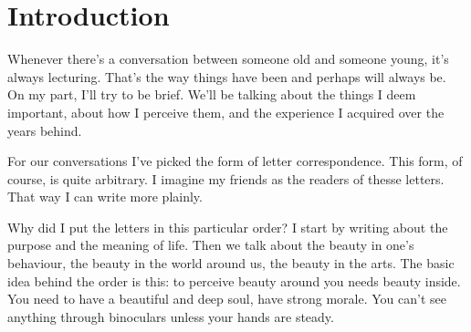 \chapter*{Introduction}

Whenever there's a conversation between someone old and someone young, it's always lecturing. That's the way things have been and perhaps will always be. On my part, I'll try to be brief. We'll be talking about the things I deem important, about how I perceive them, and the experience I acquired over the years behind.\par

For our conversations I've picked the form of letter correspondence. This form, of course, is quite arbitrary. I imagine my friends as the readers of thesse letters. That way I can write more plainly.\par

Why did I put the letters in this particular order? I start by writing about the purpose and the meaning of life. Then we talk about the beauty in one's behaviour, the beauty in the world around us, the beauty in the arts. The basic idea behind the order is this: to perceive beauty around you needs beauty inside. You need to have a beautiful and deep soul, have strong morale. You can't see anything through binoculars unless your hands are steady.